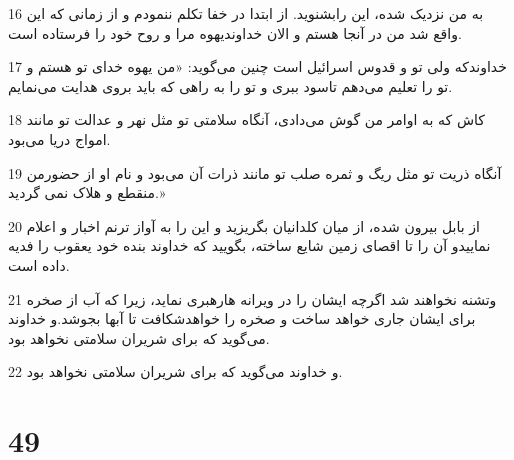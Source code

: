\par 16 به من نزدیک شده، این رابشنوید. از ابتدا در خفا تکلم ننمودم و از زمانی که این واقع شد من در آنجا هستم و الان خداوندیهوه مرا و روح خود را فرستاده است.
\par 17 خداوندکه ولی تو و قدوس اسرائیل است چنین می‌گوید: «من یهوه خدای تو هستم و تو را تعلیم می‌دهم تاسود ببری و تو را به راهی که باید بروی هدایت می‌نمایم.
\par 18 کاش که به اوامر من گوش می‌دادی، آنگاه سلامتی تو مثل نهر و عدالت تو مانند امواج دریا می‌بود.
\par 19 آنگاه ذریت تو مثل ریگ و ثمره صلب تو مانند ذرات آن می‌بود و نام او از حضورمن منقطع و هلاک نمی گردید.»
\par 20 از بابل بیرون شده، از میان کلدانیان بگریزید و این را به آواز ترنم اخبار و اعلام نماییدو آن را تا اقصای زمین شایع ساخته، بگویید که خداوند بنده خود یعقوب را فدیه داده است.
\par 21 وتشنه نخواهند شد اگر‌چه ایشان را در ویرانه هارهبری نماید، زیرا که آب از صخره برای ایشان جاری خواهد ساخت و صخره را خواهدشکافت تا آبها بجوشد.و خداوند می‌گوید که برای شریران سلامتی نخواهد بود.
\par 22 و خداوند می‌گوید که برای شریران سلامتی نخواهد بود.
 
\chapter{49}

